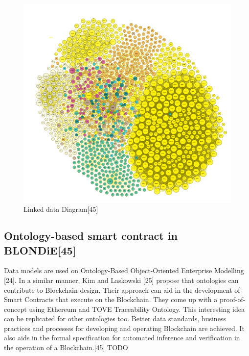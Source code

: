 \begin{center}
	\begin{figure}[htb!]
		
		\begin{minipage}{0.55\linewidth}
			\centering
			\includegraphics[width=1.95\textwidth]{images/chap02_LinkData.png}
		\end{minipage}
		\caption[Linked data diagram]{Linked data Diagram[45]}
		
		
	\end{figure}
	
\end{center}

\subsection{Ontology-based smart contract in BLONDiE[45]}
Data models are used on Ontology-Based Object-Oriented
Enterprise Modelling [24]. In a similar manner, Kim and
Laskowski [25] propose that ontologies can contribute to
Blockchain design. Their approach can aid in the development
of Smart Contracts that execute on the Blockchain.
They come up with a proof-of-concept using Ethereum
and TOVE Traceability Ontology. This interesting idea can
be replicated for other ontologies too. Better data standards,
business practices and processes for developing and operating
Blockchain are achieved. It also aids in the formal specification
for automated inference and verification in the operation of a
Blockchain.[45] TODO

